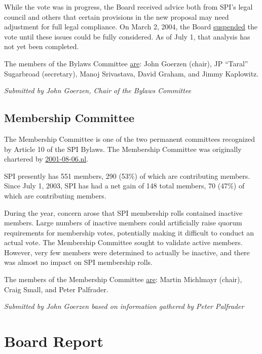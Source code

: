 \documentclass[letterpaper]{report}
\begin{document}
While the vote was in progress, the Board received advice both from
SPI's legal council and others that certain provisions in the new
proposal may need adjustment for full legal compliance. On March 2,
2004, the Board \href{http://lists.spi-inc.org/pipermail/spi-announce/2004/000073.html}{suspended}
the vote until these issues could be fully considered. As of July
1, that analysis has not yet been completed.

The members of the Bylaws Committee \href{http://lists.spi-inc.org/pipermail/spi-bylaws/2003/000003.html}{are}:
John Goerzen (chair), JP ``Taral'' Sugarbroad (secretary), Manoj
Srivastava, David Graham, and Jimmy Kaplowitz.

\emph{Submitted by John Goerzen, Chair of the Bylaws Committee}


\section{Membership Committee}

The Membership Committee is one of the two permanent committees recognized
by Article 10 of the SPI Bylaws. The Membership Committee was originally
chartered by \href{http://www.spi-inc.org/corporate/resolutions/2001/2001-08-06.nl}{2001-08-06.nl}.

SPI presently has 551 members, 290 (53\%) of which are contributing
members. Since July 1, 2003, SPI has had a net gain of 148 total members,
70 (47\%) of which are contributing members.

During the year, concern arose that SPI membership rolls contained
inactive members. Large numbers of inactive members could artificially
raise quorum requirements for membership votes, potentially making
it difficult to conduct an actual vote. The Membership Committee sought
to validate active members. However, very few members were determined
to actually be inactive, and there was almost no impact on SPI membership
rolls.

The members of the Membership Committee \href{http://www.spi-inc.org/meetings/minutes/2003/2003-03-11/}{are}:
Martin Michlmayr (chair), Craig Small, and Peter Palfrader.

\emph{Submitted by John Goerzen based on information gathered by Peter
Palfrader}


\chapter{Board Report}
\end{document}
